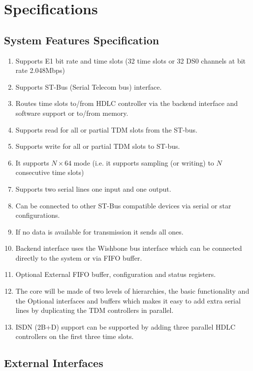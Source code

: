 \documentclass[a4paper,11pt]{article}
\begin{document}
\section{Specifications}

\subsection{System Features Specification}
\begin{enumerate}
\item Supports E1 bit rate and time slots (32 time slots or 32 DS0 channels at bit rate 2.048Mbps)
\item Supports ST-Bus (Serial Telecom bus) interface.
\item Routes time slots to/from HDLC controller via the backend interface and software support or to/from memory.
\item Supports read for all or partial TDM slots from the ST-bus.
\item Supports write for all or partial TDM slots to ST-bus.
\item It supports $N\times 64$ mode (i.e. it supports sampling (or writing) to $N$ consecutive time slots)
\item Supports two serial lines one input and one output.
\item Can be connected to other ST-Bus compatible devices via serial or star configurations.
\item If no data is available for transmission it sends all ones.
\item Backend interface uses the Wishbone bus interface which can be connected directly to the system or via FIFO buffer.
\item Optional External FIFO buffer, configuration and status registers.
\item The core will be made of two levels of hierarchies, the basic functionality and the Optional interfaces and buffers which makes it easy to add extra serial lines by duplicating the TDM controllers in parallel.
\item ISDN (2B+D) support can be supported by adding three parallel HDLC controllers on the first three time slots.
\end{enumerate}

\subsection{External Interfaces}
\end{document}

